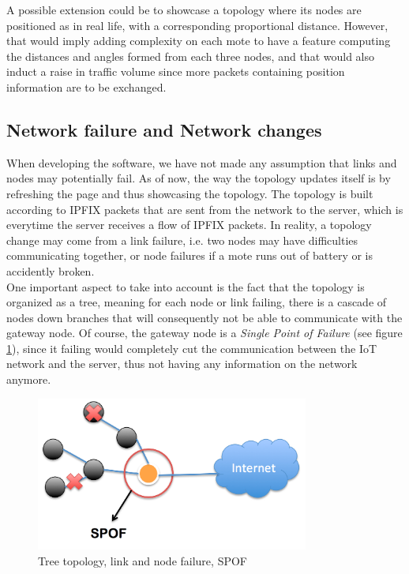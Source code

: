 A possible extension could be to showcase a topology where its nodes are positioned as in real life, with a corresponding proportional distance. However, that would imply adding complexity on each mote to have a feature computing the distances and angles formed from each three nodes, and that would also induct a raise in traffic volume since more packets containing position information are to be exchanged.

\subsection{Network failure and Network changes}

When developing the software, we have not made any assumption that links and nodes may potentially fail. As of now, the way the topology updates itself is by refreshing the page and thus showcasing the topology. The topology is built according to IPFIX packets that are sent from the network to the server, which is everytime the server receives a flow of IPFIX packets. In reality, a topology change may come from a link failure, i.e. two nodes may have difficulties communicating together, or node failures if a mote runs out of battery or is accidently broken. \\

One important aspect to take into account is the fact that the topology is organized as a tree, meaning for each node or link failing, there is a cascade of nodes down branches that will consequently not be able to communicate with the gateway node. Of course, the gateway node is a \textit{Single Point of Failure} (see figure \ref{fig:spof}), since it failing would completely cut the communication between the IoT network and the server, thus not having any information on the network anymore.\\

\begin{figure}[!h]
	\centering
	\includegraphics[width=0.8\textwidth]{res/spof.png}
	\caption{Tree topology, link and node failure, SPOF}
	\label{fig:spof}
\end{figure}

